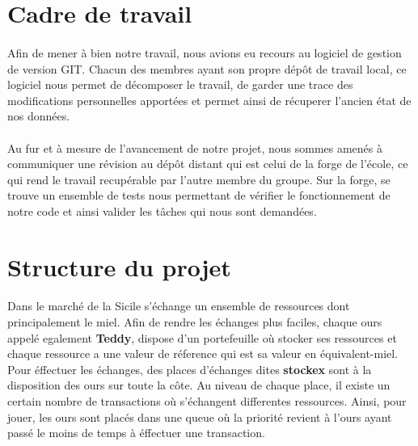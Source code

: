 \documentclass[a4paper,12pt]{article}
\begin{document}
\section{Cadre de travail}
\paragraph{}
Afin de mener à bien notre travail, nous avions eu recours au logiciel de gestion de version GIT. Chacun des membres ayant son propre dépôt de travail local, ce logiciel nous permet de décomposer le travail, de garder une trace des modifications personnelles apportées et permet ainsi de récuperer l'ancien état de nos données.

\paragraph{}
Au fur et à mesure de l'avancement de notre projet, nous sommes amenés à communiquer une révision au dépôt distant qui est celui de la forge de l'école, ce qui rend le travail recupérable par l'autre membre du groupe. Sur la forge, se trouve un ensemble de tests nous permettant de vérifier le fonctionnement de notre code et ainsi valider les tâches qui nous sont demandées.

\section{Structure du projet}

\paragraph{}
Dans le marché de la Sicile s'échange un ensemble de ressources dont principalement le miel. Afin de rendre les échanges plus faciles, chaque ours appelé egalement \textbf{Teddy}, dispose d'un portefeuille où stocker ses ressources et chaque ressource a une valeur de réference qui est sa valeur en équivalent-miel.\\
Pour éffectuer les échanges, des places d'échanges dites \textbf{stockex} sont à la disposition des ours sur toute la côte. Au niveau de chaque place, il existe un certain nombre de transactions où s'échangent differentes ressources.
Ainsi, pour jouer, les ours sont placés dans une queue où la priorité revient à l'ours ayant passé le moins de temps à éffectuer une transaction.
\end{document}
